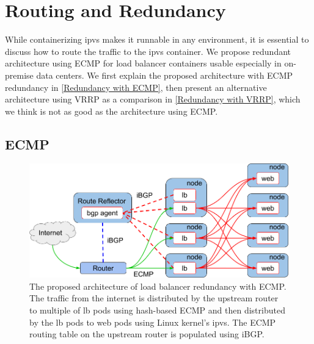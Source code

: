 \section{Routing and Redundancy}

While containerizing ipvs makes it runnable in any environment, it is essential to discuss how to route the traffic to the ipvs container.
We propose redundant architecture using ECMP for load balancer containers usable especially in on-premise data centers.
We first explain the proposed architecture with ECMP redundancy in \ref{Redundancy with ECMP}, then  present an alternative architecture using VRRP as a comparison in \ref{Redundancy with VRRP}, which we think is not as good as the architecture using ECMP.

\subsection{ECMP}\label{Subsec:Redundancy with ECMP}

\begin{figure}[tb]
  \centering
  \includegraphics[width=0.8\columnwidth]{Figs/ecmp.png}
\caption{
  The proposed architecture of load balancer redundancy with ECMP. %
  The traffic from the internet is distributed by the upstream router to multiple of lb pods using hash-based ECMP and then distributed by the lb pods to web pods using Linux kernel's ipvs.
  The ECMP routing table on the upstream router is populated using iBGP.
}
\label{fig:ecmp}
\end{figure}

